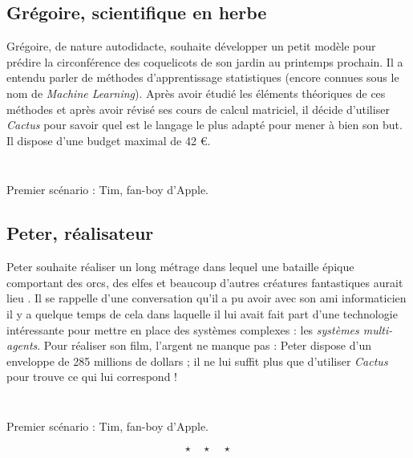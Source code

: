 \documentclass[a4paper,12pt]{article}
\begin{document}
	\subsection{Grégoire, scientifique en herbe}
	
	Grégoire, de nature autodidacte, souhaite développer un petit modèle pour prédire la circonférence des coquelicots de son jardin au printemps prochain. Il a entendu parler de méthodes d'apprentissage statistiques (encore connues sous le nom de \textit{Machine Learning}). Après avoir étudié les éléments théoriques de ces méthodes et après avoir révisé ses cours de calcul matriciel, il décide d'utiliser \textit{Cactus} pour savoir quel est le langage le plus adapté pour mener à bien son but. Il dispose d'une budget maximal de 42 €.

\begin{listing}[H]
	\centering
	\inputminted[breaklines=true,linenos,lastline=29]{text}{../scenarioGreg.txt}
\end{listing}
	
\begin{listing}[H]
	\centering
	\inputminted[breaklines=true,linenos,firstline=30]{text}{../scenarioGreg.txt}
	\caption{Premier scénario : Tim, fan-boy d'Apple.}
\end{listing}


	\subsection{Peter, réalisateur}
	
	Peter souhaite réaliser un long métrage dans lequel une bataille épique comportant des orcs, des elfes et beaucoup d'autres créatures fantastiques aurait lieu . Il se rappelle d'une conversation qu'il a pu avoir avec son ami informaticien il y a quelque temps de cela dans laquelle il lui avait fait part d'une technologie intéressante pour mettre en place des systèmes complexes : les \textit{systèmes multi-agents}. Pour réaliser son film, l'argent ne manque pas : Peter dispose d'un enveloppe de 285 millions de dollars ; il ne lui suffit plus que d'utiliser \textit{Cactus} pour trouve ce qui lui correspond !


\begin{listing}[H]
	\centering
	\inputminted[breaklines=true,linenos,lastline=29]{text}{../scenarioPeter.txt}
\end{listing}
	
\begin{listing}[H]
	\centering
	\inputminted[breaklines=true,linenos,firstline=30]{text}{../scenarioPeter.txt}
	\caption{Premier scénario : Tim, fan-boy d'Apple.}
\end{listing}


\[ \star \quad \star \quad \star \]
\newpage

\end{document}
